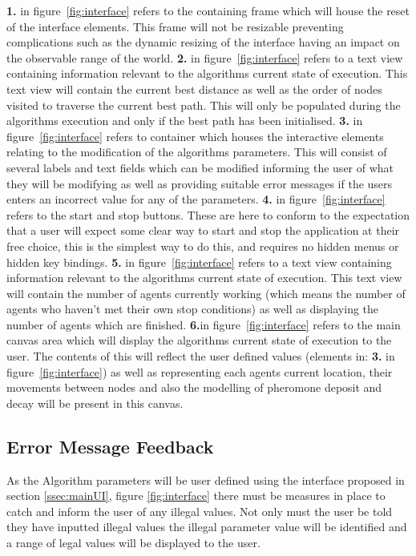 \noindent
\textbf{1.} in figure~\ref{fig:interface} refers to the containing frame which will house the reset of the interface elements. This frame will not be resizable preventing complications such as the dynamic resizing of the interface having an impact on the observable range of the world.
\noindent
\textbf{2.} in figure~\ref{fig:interface} refers to a text view containing information relevant to the algorithms current state of execution. This text view will contain the current best distance as well as the order of nodes visited to traverse the current best path. This will only be populated during the algorithms execution and only if the best path has been initialised.
\noindent
\textbf{3.} in figure~\ref{fig:interface} refers to container which houses the interactive elements relating to the modification of the algorithms parameters. This will consist of several labels and text fields which can be modified informing the user of what they will be modifying as well as providing suitable error messages if the users enters an incorrect value for any of the parameters.
\noindent
\textbf{4.} in figure~\ref{fig:interface} refers to the start and stop buttons. These are here to conform to the expectation that a user will expect some clear way to start and stop the application at their free choice, this is the simplest way to do this, and requires no hidden menus or hidden key bindings.
\noindent
\textbf{5.} in figure~\ref{fig:interface} refers to a text view containing information relevant to the algorithms current state of execution. This text view will contain the number of agents currently working (which means the number of agents who haven't met their own stop conditions) as well as displaying the number of agents which are finished.
\noindent
\textbf{6.}in figure~\ref{fig:interface} refers to the main canvas area which will display the algorithms current state of execution to the user. The contents of this will reflect the user defined values (elements in: \textbf{3.} in figure~\ref{fig:interface}) as well as representing each agents current location, their movements between nodes and also the modelling of pheromone deposit and decay will be present in this canvas.

\subsection{Error Message Feedback}

As the Algorithm parameters will be user defined using the interface proposed in section \ref{ssec:mainUI}, figure \ref{fig:interface} there must be measures in place to catch and inform the user of any illegal values. Not only must the user be told they have inputted illegal values the illegal parameter value will be identified and a range of legal values will be displayed to the user.

